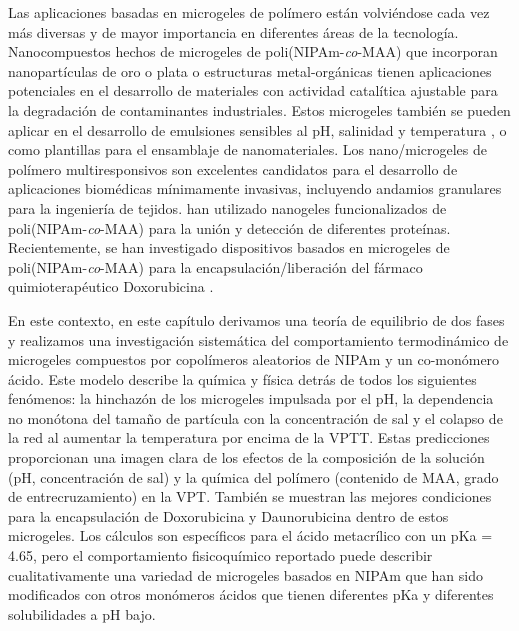 Las aplicaciones basadas en microgeles de pol\'imero est\'an volvi\'endose cada vez m\'as diversas y de mayor importancia en diferentes \'areas de la tecnolog\'ia\cite{plamper2017functional}.
Nanocompuestos hechos de microgeles de poli(NIPAm-\emph{co}-MAA) que incorporan nanopart\'iculas de oro o plata o estructuras metal-org\'anicas tienen aplicaciones potenciales en el desarrollo de materiales con actividad catal\'itica ajustable para la degradaci\'on de contaminantes industriales\cite{Khan2013synthesis,Shi2014,Allegretto2020}.
Estos microgeles tambi\'en se pueden aplicar en el desarrollo de emulsiones sensibles al pH, salinidad y temperatura \cite{Ngai2005,Ngai2006,Brugger2008,Schmidt2011}, o como plantillas para el ensamblaje de nanomateriales\cite{Wong2009}.
Los nano/microgeles de pol\'imero multiresponsivos son excelentes candidatos para el desarrollo de aplicaciones biom\'edicas m\'inimamente invasivas, incluyendo andamios granulares para la ingenier\'ia de tejidos\cite{Daly2020}.
\citet{Culver2017A} han utilizado nanogeles funcionalizados de poli(NIPAm-\emph{co}-MAA) para la uni\'on y detecci\'on de diferentes prote\'inas.
Recientemente, se han investigado dispositivos basados en microgeles de poli(NIPAm-\emph{co}-MAA) para la encapsulaci\'on/liberaci\'on del f\'armaco quimioterap\'eutico Doxorubicina \cite{Giussi2020,MartinezMoro2020,Pergushov2020}.

En este contexto, en este cap\'itulo derivamos una teor\'ia de equilibrio de dos fases y realizamos una investigaci\'on sistem\'atica del comportamiento termodin\'amico de microgeles compuestos por copol\'imeros aleatorios de NIPAm y un co-mon\'omero \'acido.
Este modelo describe la qu\'imica y f\'isica detr\'as de todos los siguientes fen\'omenos: la hinchaz\'on de los microgeles impulsada por el pH, la dependencia no mon\'otona del tama\~no de part\'icula con la concentraci\'on de sal y el colapso de la red al aumentar la temperatura por encima de la VPTT.
Estas predicciones proporcionan una imagen clara de los efectos de la composici\'on de la soluci\'on (pH, concentraci\'on de sal) y la qu\'imica del pol\'imero (contenido de MAA, grado de entrecruzamiento) en la VPT.
Tambi\'en se muestran las mejores condiciones para la encapsulaci\'on de Doxorubicina y Daunorubicina dentro de estos microgeles.
Los  c\'alculos son espec\'ificos para el \'acido metacr\'ilico con un pKa = 4.65, pero el comportamiento fisicoqu\'imico reportado puede describir cualitativamente una variedad de microgeles basados en NIPAm que han sido modificados con otros mon\'omeros \'acidos que tienen diferentes pKa y diferentes solubilidades a pH bajo.


